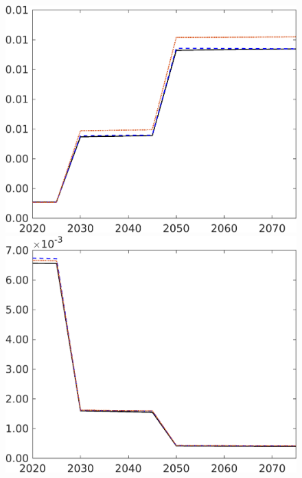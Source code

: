 \begin{figure}[h!!]
\begin{minipage}[]{0.32\textwidth}
		\includegraphics[width=1\textwidth]{../../codding_model/own_basedOnFried/optimalPol_elastS_DisuSci/figures/all_1705/Lg_CompEffOPT_T_NoTaus_spillover0_noskill1_sep1_BN0_ineq0_red0_etaa0.79_lgd0.png}
	\end{minipage}
	\begin{minipage}[]{0.32\textwidth}
		\includegraphics[width=1\textwidth]{../../codding_model/own_basedOnFried/optimalPol_elastS_DisuSci/figures/all_1705/Lf_CompEffOPT_T_NoTaus_spillover0_noskill1_sep1_BN0_ineq0_red0_etaa0.79_lgd0.png}

\end{minipage}
\end{figure}
